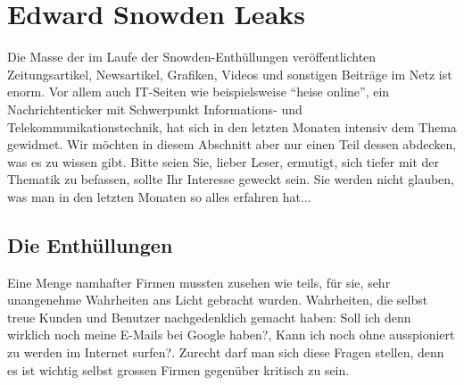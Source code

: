 \newpage
\section{Edward Snowden Leaks}
Die Masse der im Laufe der Snowden-Enthüllungen veröffentlichten Zeitungsartikel, Newsartikel, Grafiken, Videos und sonstigen Beiträge im Netz ist enorm.
Vor allem auch IT-Seiten wie beispielsweise ``heise online'', ein Nachrichtenticker mit Schwerpunkt Informations- und Telekommunikationstechnik, hat sich in den letzten Monaten intensiv dem Thema gewidmet.
Wir möchten in diesem Abschnitt aber nur einen Teil dessen abdecken, was es zu wissen gibt. Bitte seien Sie, lieber Leser, ermutigt, sich tiefer mit der Thematik zu befassen, sollte Ihr Interesse geweckt sein.
Sie werden nicht glauben, was man in den letzten Monaten so alles erfahren hat...

\subsection{Die Enthüllungen}
Eine Menge namhafter Firmen mussten zusehen wie teils, für sie, sehr unangenehme Wahrheiten ans Licht gebracht wurden. Wahrheiten, die selbst treue Kunden und Benutzer nachgedenklich gemacht haben: Soll ich denn wirklich noch meine E-Mails bei Google haben?, Kann ich noch ohne ausspioniert zu werden im Internet surfen?. Zurecht darf man sich diese Fragen stellen, denn es ist wichtig selbst grossen Firmen gegenüber kritisch zu sein.

